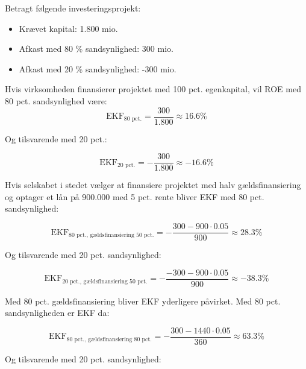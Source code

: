\documentclass[10pt,reqno, usenames]{article}
\begin{document}
\begin{tcolorbox}[colback=red!5!white, colframe=red!50!black, title=Gældsfinansiering og EKF/AG, breakable]
Betragt følgende investeringsprojekt: 

\begin{itemize}
    \item Krævet kapital: 1.800 mio.
    \item Afkast med 80 \% sandsynlighed: 300 mio. 
    \item Afkast med 20 \% sandsynlighed: -300 mio. 
\end{itemize}

Hvis virksomheden finansierer projektet med 100 pct. egenkapital, vil ROE med 80 pct. sandsynlighed være: 
 \begin{equation}
     \text{EKF}_\text{80 pct.} = \frac{300}{1.800} \approx 16.6 \% \nonumber
 \end{equation}

Og tilsvarende med 20 pct.: 

 \begin{equation}
     \text{EKF}_\text{20 pct.} = -\frac{300}{1.800} \approx -16.6 \% \nonumber
 \end{equation}

Hvis selskabet i stedet vælger at finansiere projektet med halv gældsfinansiering og optager et lån på 900.000 med 5 pct. rente bliver EKF med 80 pct. sandsynlighed: 

 \begin{equation}
     \text{EKF}_\text{80 pct., gældsfinansiering 50 pct.} = -\frac{300-900\cdot0.05}{900} \approx 28.3 \% \nonumber
 \end{equation}

Og tilsvarende med 20 pct. sandsynlighed: 

 \begin{equation}
     \text{EKF}_\text{20 pct., gældsfinansiering 50 pct.} = -\frac{-300-900\cdot0.05}{900} \approx -38.3 \% \nonumber
 \end{equation}

 Med 80 pct. gældsfinansiering bliver EKF yderligere påvirket. Med 80 pct. sandsynligheden er EKF  da: 

\begin{equation}
     \text{EKF}_\text{80 pct., gældsfinansiering 80 pct.} = -\frac{300-1440\cdot0.05}{360} \approx 63.3 \% \nonumber
 \end{equation}

 Og tilsvarende med 20 pct. sandsynlighed: 


\end{tcolorbox}
\end{document}
